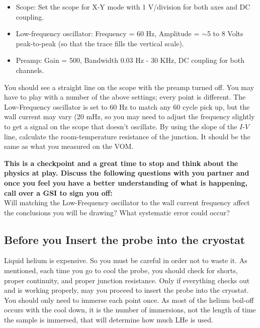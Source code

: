 \documentclass{../lab}
\begin{document}
\begin{itemize}
    \item Scope: Set the scope for X-Y mode with 1 V/division for both axes and DC coupling.

    \item Low-frequency oscillator: Frequency = 60 Hz, Amplitude = $\sim$5 to 8 Volts peak-to-peak (so that the trace fills the vertical scale).

    \item Preamp: Gain = 500, Bandwidth 0.03 Hz - 30 KHz, DC coupling for both channels.
\end{itemize}

You should see a straight line on the scope with the preamp turned off. You may have to play with a number of the above settings; every point is different. The Low-Frequency oscillator is set to 60 Hz to match any 60 cycle pick up, but the wall current may vary (20 mHz, so you may need to adjust the frequency slightly to get a signal on the scope that doesn't oscillate. By using the slope of the $I$-$V$ line, calculate the room-temperature resistance of the junction. It should be the same as what you measured on the VOM.

\textbf{This is a checkpoint and a great time to stop and think about the physics at play. Discuss the following questions with you partner and once you feel you have a better understanding of what is happening, call over a GSI to sign you off:}\\
Will matching the Low-Frequency oscillator to the wall current frequency affect the conclusions you will be drawing? What systematic error could occur?

\subsection{Before you Insert the probe into the cryostat}

Liquid helium is expensive. So you must be careful in order not to waste it. As mentioned, each time you go to cool the probe, you should check for shorts, proper continuity, and proper junction resistance. Only if everything checks out and is working properly, may you proceed to insert the probe into the cryostat. You should only need to immerse each point once. As most of the helium boil-off occurs with the cool down, it is the number of immersions, not the length of time the sample is immersed, that will determine how much LHe is used.
\end{document}
